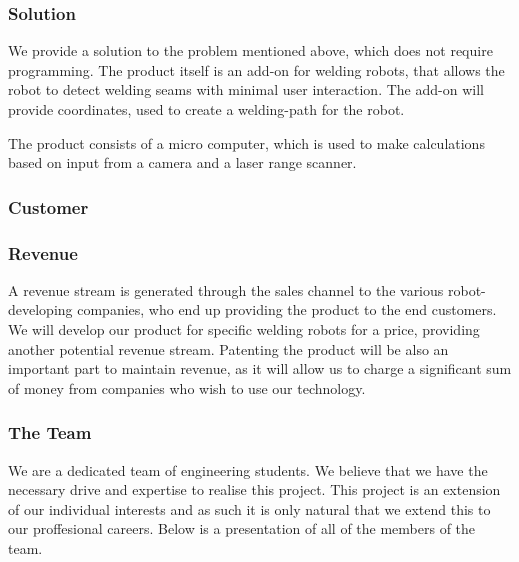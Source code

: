 \subsubsection{Solution}
We provide a solution to the problem mentioned above, which does not require programming. The product itself is an add-on for welding robots, that allows the robot to detect welding seams with minimal user interaction. The add-on will provide coordinates, used to create a welding-path for the robot. 

The product consists of a micro computer, which is used to make calculations based on input from a camera and a laser range scanner. 

\subsubsection{Customer}


\subsubsection{Revenue}
A revenue stream is generated through the sales channel to the various robot-developing companies, who end up providing the product to the end customers.
We will develop our product for specific welding robots for a price, providing another potential revenue stream. 
Patenting the product will be also an important part to maintain revenue, as it will allow us to charge a significant sum of money from companies who wish to use our technology.

\subsubsection{The Team}
We are a dedicated team of engineering students. We believe that we have the necessary drive and expertise to realise this project. This project is an extension of our individual interests and as such it is only natural that we extend this to our proffesional careers. Below is a presentation of all of the members of the team.

